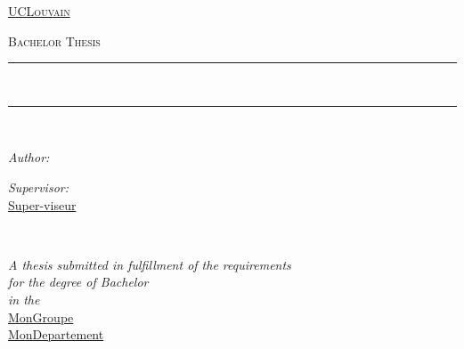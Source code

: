 \newcommand{\HRule}{\rule{.9\linewidth}{.6pt}} %
\newcommand{\decoRule}{\rule{.8\textwidth}{.4pt}} %

\begin{center}
\vspace*{.06\textheight}
{\scshape\LARGE \href{http://www.guillaumeWinant.com}{UCLouvain}\par}\vspace{1.5cm} %
\textsc{\Large Bachelor Thesis}\\[0.5cm] %

\HRule \\[0.4cm] %
{\huge \bfseries \thetitle\par}\vspace{0.4cm} %
\HRule \\[1.5cm] %
 
\begin{minipage}[t]{0.4\textwidth}
\begin{flushleft} \large
\emph{Author:}\\
\href{http://www.guillaumeWinant.com}{\theauthor} %
\end{flushleft}
\end{minipage}
\begin{minipage}[t]{0.4\textwidth}
\begin{flushright} \large
\emph{Supervisor:} \\
\href{http://www.jamessmith.com}{Super-viseur} %
\end{flushright}
\end{minipage}\\[2cm]
 
\vfill

\large \textit{A thesis submitted in fulfillment of the requirements\\ for the degree of Bachelor}\\[0.3cm] %
\textit{in the}\\[0.4cm]
\href{http://www.guillaumeWinant.com}{MonGroupe}\\
\href{http://www.guillaumeWinant.com}{MonDepartement}\\[2cm] %
 
\vfill

{\large \thedate}\\[1cm] %
 
\vfill
\end{center}